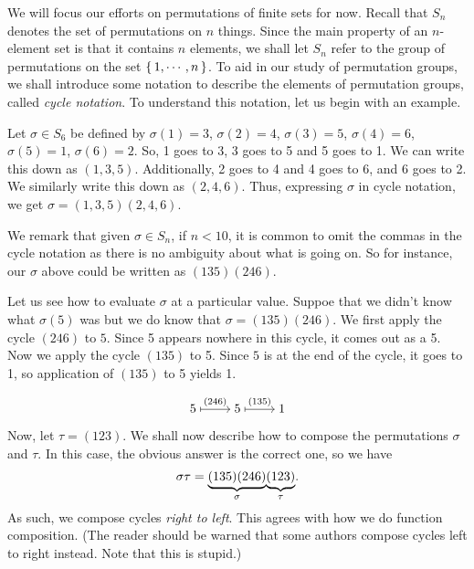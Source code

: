 \documentclass[./main.tex]{subfiles}
\begin{document}
We will focus our efforts on permutations of finite sets for now. Recall that
$S_n$ denotes the set of permutations on $n$ things. Since the main property of
an $n$-element set is that it contains $n$ elements, we shall let $S_n$ refer to
the group of permutations on the set $\set{1, \cdots, n}$. To aid in our study
of permutation groups, we shall introduce some notation to describe the elements
of permutation groups, called \emph{cycle notation}. To understand this
notation, let us begin with an example.

Let $\sigma \in S_6$ be defined by $\sigma(1) = 3$, $\sigma(2) = 4$, $\sigma(3)
= 5$, $\sigma(4) = 6$, $\sigma(5) = 1$, $\sigma(6) = 2$. So, 1 goes to 3, 3 goes
to 5 and 5 goes to 1. We can write this down as $(1,3,5)$. Additionally, 2 goes
to 4 and 4 goes to 6, and 6 goes to 2. We similarly write this down as
$(2,4,6)$. Thus, expressing $\sigma$ in cycle notation, we get $\sigma =
(1,3,5)(2,4,6)$. 

We remark that given $\sigma \in S_n$, if $n < 10$, it is common to omit the
commas in the cycle notation as there is no ambiguity about what is going on. So
for instance, our $\sigma$ above could be written as $(135)(246)$.

Let us see how to evaluate $\sigma$ at a particular value. Suppoe that we didn't
know what $\sigma(5)$ was but we do know that $\sigma = (135)(246)$. We first
apply the cycle $(246)$ to $5$. Since 5 appears nowhere in this cycle, it comes
out as a 5. Now we apply the cycle $(135)$ to 5. Since $5$ is at the end of the
cycle, it goes to 1, so application of $(135)$ to 5 yields 1.

\[\begin{tikzcd}[cramped]
	5 & 5 & 1
	\arrow["{(246)}", maps to, from=1-1, to=1-2]
	\arrow["{(135)}", maps to, from=1-2, to=1-3]
\end{tikzcd}\]



Now, let $\tau = (123)$. We shall now describe how to compose the permutations
$\sigma$ and $\tau$. In this case, the obvious answer is the correct one,
so we have
\[
    \sigma \tau = {\underbrace{(135)(246)}_{\text{$\sigma$}}} {\underbrace{(123)}_{\text{$\tau$}}}.
\]
As such, we compose cycles \emph{right to left}. This agrees with how we do
function composition. (The reader should be warned that some authors compose
cycles left to right instead. Note that this is stupid.)
\end{document}
